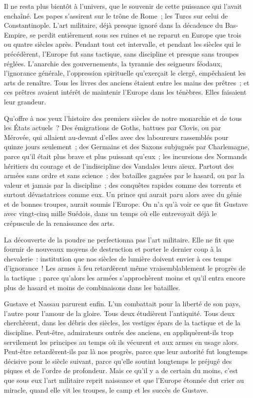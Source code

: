 \documentclass[french,twoside]{book} %
\begin{document}
Il ne resta plus bientôt à l’univers, que le souvenir de cette puissance qui l’avait enchaîné. Les papes s’assirent sur le trône de Rome ; les Turcs sur celui de Constantinople. L’art militaire, déjà presque ignoré dans la décadence du Bas-Empire, se perdit entièrement sous ses ruines et ne reparut en Europe que trois ou quatre siècles après. Pendant tout cet intervalle, et pendant les siècles qui le précédèrent, l’Europe fut sans tactique, sans discipline et presque sans troupes réglées. L’anarchie des gouvernements, la tyrannie des seigneurs féodaux, l’ignorance générale, l’oppression spirituelle qu’exerçait le clergé, empêchaient les arts de renaître. Tous les livres des anciens étaient entre les mains des prêtres ; et ces prêtres avaient intérêt de maintenir l’Europe dans les ténèbres. Elles faisaient leur grandeur.\par
Qu’offre à nos yeux l’histoire des premiers siècles de notre monarchie et de tous les États actuels ? Des émigrations de Goths, battues par Clovis, ou par Mérovée, qui allaient au-devant d’elles avec des laboureurs rassemblés pour quinze jours seulement ; des Germains et des Saxons subjugués par Charlemagne, parce qu’il était plus brave et plus puissant qu’eux ; les incursions des Normands héritiers du courage et de l’indiscipline des Vandales leurs aïeux. Partout des armées sans ordre et sans science ; des batailles gagnées par le hasard, ou par la valeur et jamais par la discipline ; des conquêtes rapides comme des torrents et surtout dévastatrices comme eux. Un prince qui aurait paru alors avec du génie et de bonnes troupes, aurait soumis l’Europe. On n’a qu’à voir ce que fit Gustave avec vingt-cinq mille Suédois, dans un temps où elle entrevoyait déjà le crépuscule de la renaissance des arts.\par
La découverte de la poudre ne perfectionna pas l’art militaire. Elle ne fit que fournir de nouveaux moyens de destruction et porter le dernier coup à la chevalerie : institution que nos siècles de lumière doivent envier à ces temps d’ignorance ! Les armes à feu retardèrent même vraisemblablement le progrès de la tactique ; parce qu’alors les armées s’approchèrent moins et qu’il entra encore plus de hasard et moins de combinaisons dans les batailles.\par
Gustave et Nassau parurent enfin. L’un combattait pour la liberté de son pays, l’autre pour l’amour de la gloire. Tous deux étudièrent l’antiquité. Tous deux cherchèrent, dans les débris des siècles, les vestiges épars de la tactique et de la discipline. Peut-être, admirateurs outrés des anciens, en appliquèrent-ils trop servilement les principes au temps où ils vécurent et aux armes en usage alors. Peut-être retardèrent-ils par là nos progrès, parce que leur autorité fut longtemps décisive pour le siècle suivant, parce qu’elle soutint longtemps le préjugé des piques et de l’ordre de profondeur. Mais ce qu’il y a de certain du moins, c’est que sous eux l’art militaire reprit naissance et que l’Europe étonnée dut crier au miracle, quand elle vit les troupes, le camp et les succès de Gustave.\par
\end{document}
